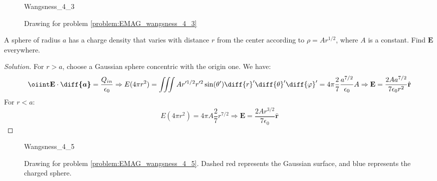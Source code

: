 \documentclass[crop=false,class=book,oneside]{standalone}
\begin{document}
            \begin{figure}
                \centering
                \captionsetup{type=figure}
                {Wangsness_4_3}
                \caption[Drawing for Wangsness 4-3]
                {Drawing for problem \ref{problem:EMAG_wangsness_4_3}}
                \label{fig:EMAG_1_Wangsness_4_3}
            \end{figure}
            \begin{problem}[Wangsness 4-5]
                \label{problem:EMAG_wangsness_4_5}
                A sphere of radius $a$ has a charge density that varies
                with distance $r$ from the center according to
                $\rho=Ar^{1/2}$, where $A$ is a constant.
                Find $\mathbf{E}$ everywhere.
            \end{problem}
            \begin{proof}[Solution]
                For $r>a$, choose a Gaussian sphere concentric with
                the origin one. We have:
                \begin{equation*}
                    \oiint\mathbf{E}\cdot\boldsymbol{\diff{a}}
                    =\frac{Q_{in}}{\epsilon_{0}}\Rightarrow
                    E(4\pi r^{2})
                    =\iiint{A}r'^{1/2}r'^{2}
                    \sin(\theta')\diff{r}'\diff{\theta}'\diff{\varphi}'
                    =4\pi\frac{2}{7}\frac{a^{7/2}}{\epsilon_{0}}A
                    \Rightarrow\mathbf{E}
                    =\frac{2Aa^{7/2}}{7\epsilon_{0}r^{2}}\hat{\mathbf{r}}
                \end{equation*}
                For $r<a$:
                \begin{equation*}
                    E(4\pi r^{2})
                    =4\pi A\frac{2}{7}r^{7/2}\Rightarrow
                    \mathbf{E}
                    =\frac{2Ar^{3/2}}{7\epsilon_{0}}\hat{\mathbf{r}}
                \end{equation*}
            \end{proof}
            \begin{figure}[H]
                \centering
                \captionsetup{type=figure}
                {Wangsness_4_5}
                \caption[Drawing for Wangsness 4-3]{%
                    Drawing for problem \ref{problem:EMAG_wangsness_4_5}.
                    Dashed red represents the Gaussian surface,
                    and blue represents the charged sphere.
                }
                \label{fig:EMAG_1_Wangsness_4_5}
            \end{figure}
\end{document}

